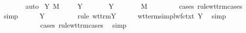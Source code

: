 \begin{isabellebody}
\ \ \isamarkupfalse%
\ {}\ {}{\isacharparenleft}{}{\isacharparenright}\ \isamarkupfalse%
\ auto\isanewline
{}\isamarkupfalse%
\isanewline
{}\isamarkupfalse%
\ {\isacharparenleft}Y\ M\ {\isasymtau}{\isacharparenright}\isanewline
\ \ \isamarkupfalse%
\ Y{\isacharparenleft}{}{\isacharparenright}\ \isamarkupfalse%
\ {\isasympi}\ \ {}{\isacharcolon}\ {\isachardoublequoteopen}{\isasymGamma}\ {\isasymturnstile}\ {\isacharparenleft}Y\ {\isasymtau}{\isacharparenright}\ {\isacharcolon}\ {\isasympi}\ {\isasymrightarrow}\ {\isasymsigma}{\isachardoublequoteclose}\ {\isachardoublequoteopen}{\isasymGamma}\ {\isasymturnstile}\ M\ {\isacharcolon}\ {\isasympi}{\isachardoublequoteclose}\ \isanewline
\ \ \ \ \isamarkupfalse%
\ {\isacharparenleft}cases\ rule{\isacharcolon}wt{\isacharunderscore}trm{\isachardot}cases{\isacharparenright}\ \isamarkupfalse%
\ simp\isanewline
\ \ \isamarkupfalse%
\ {\isachardoublequoteopen}{\isasymGamma}\ {\isasymturnstile}\ {\isacharparenleft}Y\ {\isasymtau}{\isacharparenright}\ {\isacharcolon}\ {\isacharparenleft}{\isasymtau}\ {\isasymrightarrow}\ {\isasymtau}{\isacharparenright}\ {\isasymrightarrow}\ {\isasymtau}{\isachardoublequoteclose}\ \isamarkupfalse%
\ {\isacharparenleft}rule\ wt{\isacharunderscore}trm{\isachardot}Y{\isacharparenright}\isanewline
\ \ \ \ \isamarkupfalse%
\ wt{\isacharunderscore}terms{\isacharunderscore}impl{\isacharunderscore}wf{\isacharunderscore}ctxt\ Y\ \isamarkupfalse%
\ simp\isanewline
\ \ \isamarkupfalse%
\ {}{\isacharparenleft}{}{\isacharparenright}\ \isamarkupfalse%
\ {\isachardoublequoteopen}{\isasympi}\ {\isasymrightarrow}\ {\isasymsigma}\ {\isacharequal}\ {\isacharparenleft}{\isasymtau}\ {\isasymrightarrow}\ {\isasymtau}{\isacharparenright}\ {\isasymrightarrow}\ {\isasymtau}{\isachardoublequoteclose}\ \isamarkupfalse%
\ {\isacharparenleft}cases\ rule{\isacharcolon}wt{\isacharunderscore}trm{\isachardot}cases{\isacharparenright}\ \isamarkupfalse%
\ simp\isanewline
\ \ \isamarkupfalse%
\ \isamarkupfalse%
\ {}{\isacharcolon}\ {\isachardoublequoteopen}{\isasympi}\ {\isacharequal}\ {\isasymtau}\ {\isasymrightarrow}\ {\isasymtau}{\isachardoublequoteclose}\ {\isachardoublequoteopen}{\isasymsigma}\ {\isacharequal}\ {\isasymtau}{\isachardoublequoteclose}\ \isamarkupfalse%

\end{isabellebody}

